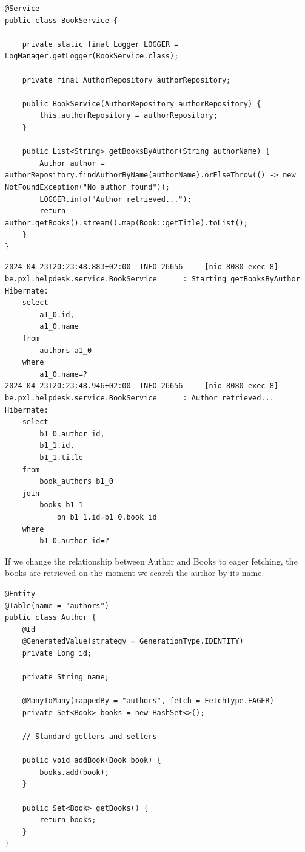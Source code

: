 \begin{lstlisting}
@Service
public class BookService {

    private static final Logger LOGGER = LogManager.getLogger(BookService.class);

    private final AuthorRepository authorRepository;

    public BookService(AuthorRepository authorRepository) {
        this.authorRepository = authorRepository;
    }

    public List<String> getBooksByAuthor(String authorName) {
        Author author = authorRepository.findAuthorByName(authorName).orElseThrow(() -> new NotFoundException("No author found"));
        LOGGER.info("Author retrieved...");
        return author.getBooks().stream().map(Book::getTitle).toList();
    }
}
\end{lstlisting}

\begin{verbatim}
2024-04-23T20:23:48.883+02:00  INFO 26656 --- [nio-8080-exec-8] be.pxl.helpdesk.service.BookService      : Starting getBooksByAuthor
Hibernate: 
    select
        a1_0.id,
        a1_0.name 
    from
        authors a1_0 
    where
        a1_0.name=?
2024-04-23T20:23:48.946+02:00  INFO 26656 --- [nio-8080-exec-8] be.pxl.helpdesk.service.BookService      : Author retrieved...
Hibernate: 
    select
        b1_0.author_id,
        b1_1.id,
        b1_1.title 
    from
        book_authors b1_0 
    join
        books b1_1 
            on b1_1.id=b1_0.book_id 
    where
        b1_0.author_id=?
\end{verbatim}

If we change the relationship between Author and Books to eager fetching, the books are retrieved on the moment we search the author by its name.


\begin{lstlisting}
@Entity
@Table(name = "authors")
public class Author {
    @Id
    @GeneratedValue(strategy = GenerationType.IDENTITY)
    private Long id;

    private String name;

    @ManyToMany(mappedBy = "authors", fetch = FetchType.EAGER)
    private Set<Book> books = new HashSet<>();

    // Standard getters and setters

    public void addBook(Book book) {
        books.add(book);
    }

    public Set<Book> getBooks() {
        return books;
    }
}
\end{lstlisting}


